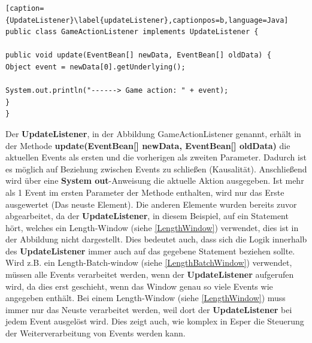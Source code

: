 \begin{lstlisting}[caption={UpdateListener}\label{updateListener},captionpos=b,language=Java]
public class GameActionListener implements UpdateListener {

public void update(EventBean[] newData, EventBean[] oldData) {
Object event = newData[0].getUnderlying();

System.out.println("------> Game action: " + event);
}
}
\end{lstlisting}

Der \textbf{UpdateListener}, in der Abbildung GameActionListener genannt, erhält in der Methode \textbf{update(EventBean[] newData, EventBean[] oldData)} die aktuellen Events als ersten und die vorherigen als zweiten Parameter. Dadurch ist es möglich auf Beziehung zwischen Events zu schließen (Kausalität).
\absatz
Anschließend wird über eine \textbf{System out}-Anweisung die aktuelle Aktion ausgegeben. Ist mehr als 1 Event im ersten Parameter der Methode enthalten, wird nur das Erste ausgewertet (Das neuste Element). Die anderen Elemente wurden bereits zuvor abgearbeitet, da der \textbf{UpdateListener}, in diesem Beispiel, auf ein Statement hört, welches ein Length-Window (siehe \ref{LengthWindow}) verwendet, dies ist in der Abbildung nicht dargestellt.
\absatz
Dies bedeutet auch, dass sich die Logik innerhalb des \textbf{UpdateListener} immer auch auf das gegebene Statement beziehen sollte. Wird z.B. ein Length-Batch-window (siehe \ref{LengthBatchWindow}) verwendet, müssen alle Events verarbeitet werden, wenn der \textbf{UpdateListener} aufgerufen wird, da dies erst geschieht, wenn das Window genau so viele Events wie angegeben enthält. Bei einem Length-Window (siehe \ref{LengthWindow}) muss immer nur das Neuste verarbeitet werden, weil dort der \textbf{UpdateListener} bei jedem Event ausgelöst wird. 
Dies zeigt auch, wie komplex in Esper die Steuerung der Weiterverarbeitung von Events werden kann. 